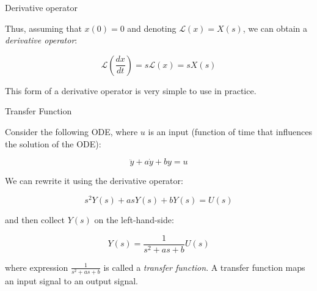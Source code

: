 \documentclass{beamer}
\begin{document}
\begin{frame}{Derivative operator}
\begin{flushleft}

Thus, assuming that $x(0) = 0$ and denoting $\mathcal{L}\left( x \right) = X(s)$, we can obtain a \emph{derivative operator}:

\begin{equation}
\label{eq:NoIC_laplace}
\mathcal{L}\left(\frac{dx}{dt}\right) = s \mathcal{L}\left(x\right) = s X(s)
\end{equation}

\bigskip

This form of a derivative operator is very simple to use in practice.

\end{flushleft}
\end{frame}



\begin{frame}{Transfer Function}
\begin{flushleft}

Consider the following ODE, where $u$ is an input (function of time that influences the solution of the ODE):

\begin{equation}
\ddot y + a \dot y + b y = u
\end{equation}

We can rewrite it using the derivative operator:

\begin{equation}
s^2 Y(s) + a s Y(s) + b Y(s) = U(s)
\end{equation}

and then collect $Y(s)$ on the left-hand-side:

\begin{equation}
Y(s) = \frac{1}{s^2 + a s + b} U(s)
\end{equation}

where expression $\frac{1}{s^2 + a s + b}$ is called a \emph{transfer function}. A transfer function maps an input signal to an output signal.

\end{flushleft}
\end{frame}
\end{document}

